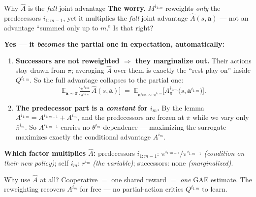 \documentclass[10pt, aspectratio=169]{beamer}
\begin{document}
\begin{frame}{Why $\hat A$ is the \emph{full} joint advantage }
\small
\textbf{The worry.} $M^{i_{1:m}}$ reweights \emph{only} the predecessors $i_{1:m-1}$, yet it multiplies the \emph{full} joint advantage $\hat A(s,\mathbf{a})$ --- not an advantage ``summed only up to $m$.'' Is that right?
\medskip

\pause
\textbf{Yes --- it \emph{becomes} the partial one in expectation, automatically:}
\begin{enumerate}\setlength\itemsep{3pt}
\item \textbf{Successors are not reweighted $\Rightarrow$ they marginalize out.} Their actions stay drawn from $\pi$; averaging $\hat A$ over them is exactly the ``rest play on'' inside $Q^{i_{1:m}}$. So the full advantage collapses to the partial one:
\[
\mathbb{E}_{\mathbf{a}\sim\pi}\!\Big[\tfrac{\bar\pi^{\,i_{1:m}}}{\pi^{i_{1:m}}}\,\hat A(s,\mathbf{a})\Big] \;=\; \mathbb{E}_{\mathbf{a}^{i_{1:m}}\sim\bar\pi^{i_{1:m}}}\!\big[A^{i_{1:m}}_\pi\big(s,\mathbf{a}^{i_{1:m}}\big)\big].
\]
\item \textbf{The predecessor part is a \emph{constant} for $i_m$.} By the lemma $A^{i_{1:m}} = A^{i_{1:m-1}} + A^{i_m}$, and the predecessors are frozen at $\bar\pi$ while we vary only $\bar\pi^{i_m}$. So $A^{i_{1:m-1}}$ carries no $\theta^{i_m}$-dependence --- maximizing the surrogate maximizes \alert{exactly the conditional advantage $A^{i_m}$}.
\end{enumerate}
\smallskip

\pause
\textbf{Which factor multiplies $\hat A$:} \;
predecessors $i_{1:m-1}$: $\bar\pi^{i_{1:m-1}}/\pi^{i_{1:m-1}}$ \emph{(condition on their new policy)};\;
self $i_m$: $r^{i_m}$ \emph{(the variable)};\;
successors: none \emph{(marginalized)}.
\smallskip

{\footnotesize\textcolor{mLightBrown}{Why use $\hat A$ at all? Cooperative $=$ one shared reward $=$ \emph{one} GAE estimate. The reweighting recovers $A^{i_m}$ for free --- no partial-action critics $Q^{i_{1:m}}$ to learn.}}
\end{frame}
\end{document}
